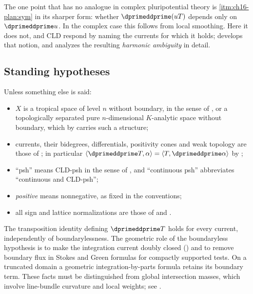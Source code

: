 The one point that has no analogue in complex pluripotential theory is
\cref{itm:ch16-plan:sym} in its sharper form: whether
$\dprimeddprime(uT)$ depends only on $\dprimeddprime u$.  In the complex
case this follows from local smoothing.  Here it does not, and CLD respond
by naming the currents for which it holds; 
develops that notion, and  analyzes the
resulting \emph{harmonic ambiguity} in detail.

\subsection{Standing hypotheses}
\label{sec:ch16-hypotheses}

Unless something else is said:
\begin{itemize}
\item $X$ is a tropical space of level $n$ without boundary, in the sense of
 , or a topologically separated pure
 $n$-dimensional $K$-analytic space without boundary, which by
  carries such a structure;
\item currents, their bidegrees, differentials, positivity cones and weak
 topology are those of ; in particular
 $\langle\dprimeddprime T,\alpha\rangle=\langle T,\dprimeddprime\alpha\rangle$
 by ;
\item ``psh'' means CLD-psh in the sense of ,
 and ``continuous psh'' abbreviates ``continuous and CLD-psh'';
\item \emph{positive} means nonnegative, as fixed in the conventions;
\item all sign and lattice normalizations are those of
  and .
\end{itemize}

The transposition identity defining $\dprimeddprime T$ holds for every
current, independently of boundarylessness.  The geometric role of the
boundaryless hypothesis is to make the integration current doubly closed
() and to remove boundary flux in Stokes and
Green formulas for compactly supported tests.  On a truncated domain a
geometric integration-by-parts formula retains its boundary term.  These
facts must be distinguished from global intersection masses, which involve
line-bundle curvature and local weights; see
.

